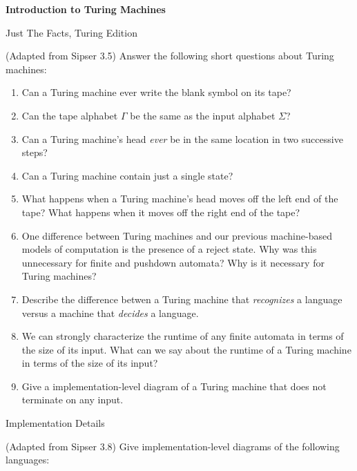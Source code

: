 \documentclass[11pt]{book}
\newcommand{\doctitle}{Introduction to Turing Machines}
\begin{document}
\begin{center}
  \large\textbf{{\doctitle}}
\end{center}

\vspace{2em}


\begin{problem}{Just The Facts, Turing Edition}

(Adapted from Sipser 3.5)
Answer the following short questions about Turing machines:

\begin{enumerate}[label=(\alph*)]
  \item Can a Turing machine ever write the blank symbol \texttt{\textvisiblespace} on its tape?
  \item Can the tape alphabet \( Γ \) be the same as the input alphabet \( Σ \)?
  \item Can a Turing machine's head \emph{ever} be in the same location in two successive steps?
  \item Can a Turing machine contain just a single state?
  \item What happens when a Turing machine's head moves off the left end of the tape?  What happens when it moves off the right end of the tape?
  \item One difference between Turing machines and our previous machine-based models of computation is the presence of a reject state.
    Why was this unnecessary for finite and pushdown automata?
    Why is it necessary for Turing machines?
  \item Describe the difference betwen a Turing machine that \emph{recognizes} a language versus a machine that \emph{decides} a language.
  \item We can strongly characterize the runtime of any finite automata in terms of the size of its input.
    What can we say about the runtime of a Turing machine in terms of the size of its input?
  \item Give a implementation-level diagram of a Turing machine that does not terminate on any input.
\end{enumerate}

\end{problem}

\newpage


\begin{problem}{Implementation Details}

(Adapted from Sipser 3.8)
Give implementation-level diagrams of the following languages:

\end{problem}
\end{document}
